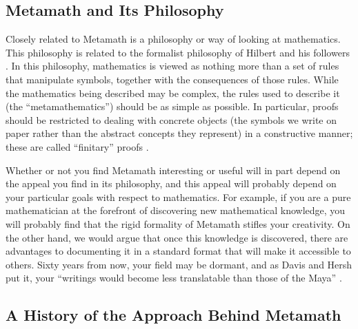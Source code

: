 

\subsection{Metamath and Its Philosophy}

Closely related to Metamath is a philosophy or way of looking
at mathematics. This philosophy is related to the formalist
philosophy of Hilbert and his followers
\cite[pp.~1203--1208]{Kline}
\cite[p.~6]{Behnke}. In this philosophy, mathematics is
viewed as nothing more than a set of rules that manipulate symbols, together
with the consequences of those rules.  While the mathematics being described
may be complex, the rules used to describe it (the
``metamathematics'') should be as simple as possible.
In particular, proofs should be restricted to dealing with concrete objects
(the symbols we write on paper rather than the abstract concepts they
represent) in a constructive manner; these are called ``finitary''
proofs \cite[pp.~2--3]{Shoenfield}.

Whether or not you find Metamath interesting or useful will in part depend on
the appeal you find in its philosophy, and this appeal will probably depend on
your particular goals with respect to mathematics.  For example, if you are a
pure mathematician at the forefront of discovering new mathematical knowledge,
you will probably find that the rigid formality of Metamath stifles your
creativity.  On the other hand, we would argue that once this knowledge is
discovered, there are advantages to documenting it in a standard format that
will make it accessible to others.  Sixty years from now, your field may be
dormant, and as Davis and Hersh put it, your ``writings would become less
translatable than those of the Maya'' \cite[p.~37]{Davis}.


\subsection{A History of the Approach Behind Metamath}

